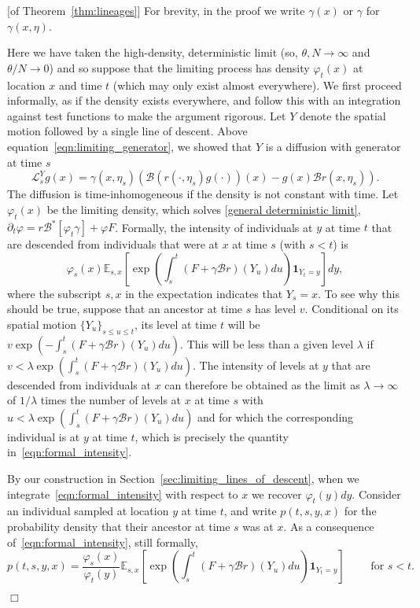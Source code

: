 \documentclass[12pt]{article}
\newenvironment {proof}{{\noindent\bf Proof }}{\hfill $\Box$ \medskip}
\newcommand{\IE}{\mathbb E}
\newcommand{\ind}{\mathbf{1}}
\newcommand{\DG}{\mathcal{B}}  %
\numberwithin{equation}{section}
\begin{document}
\begin{proof}[of Theorem~\ref{thm:lineages}]
For brevity, in the proof we write $\gamma(x)$ or $\gamma$ for $\gamma(x,\eta)$.

Here we have taken the high-density, deterministic limit
(so, $\theta, N \to \infty$ and $\theta/N \to 0$)
and so suppose that the limiting process has density $\varphi_t(x)$
at location $x$ and time $t$ (which may only exist almost everywhere).
We first proceed informally, as if the density exists everywhere,
and follow this with an integration against test functions to make the argument rigorous.
Let $Y$ denote the spatial motion followed by a single line of descent.
Above equation~\eqref{eqn:limiting_generator},
we showed that $Y$ is a diffusion with generator at time $s$
$$
    \mathcal{L}^Y_s g(x) = \gamma(x,\eta_s) ( \DG(r(\cdot,\eta_s) g(\cdot))(x) - g(x) \DG r(x,\eta_s) ) .
$$
The diffusion is time-inhomogeneous if the density is not constant with time.
Let $\varphi_t(x)$ be the limiting density, which solves \eqref{general deterministic limit},
$\partial_t \varphi = r \DG^*[ \varphi_t \gamma ] + \varphi F$.
Formally, the intensity of individuals at $y$ at time $t$
that are descended from individuals that were at $x$ at time $s$
(with $s < t$) is
\begin{equation} \label{eqn:formal_intensity}
    \varphi_s(x) \IE_{s,x} \left[
        \exp\left(
            \int_s^t (F + \gamma \DG r)(Y_u) du
        \right)
        \ind_{Y_t = y}
    \right]
    dy ,
\end{equation}
where the subscript $s, x$ in the expectation indicates that $Y_s = x$.
To see why this should be true, 
suppose that an ancestor at time $s$ has level $v$. Conditional on its 
spatial motion $\{Y_u\}_{s\leq u\leq t}$, its level at time $t$ will
be $v \exp(-\int_s^t(F+\gamma\DG r)(Y_u)du)$. This will be less than a given level 
$\lambda$ if $v < \lambda \exp(\int_s^t(F+\gamma\DG r)(Y_u)du)$. 
The intensity of levels at $y$ that are descended from individuals at
$x$ can therefore be obtained as the limit as $\lambda\to\infty$ of 
$1/\lambda$ times the number of levels at $x$ at time $s$ with
$u<\lambda \exp(\int_s^t(F+\gamma\DG r)(Y_u)du)$ and for which
the corresponding individual is at $y$ at time $t$, which is 
precisely the quantity in~\eqref{eqn:formal_intensity}. 

By our construction in Section~\ref{sec:limiting_lines_of_descent},
when we integrate~\eqref{eqn:formal_intensity}
with respect to $x$ we recover $\varphi_t(y)dy$. 
Consider an individual sampled at location $y$ at time $t$,
and write $p(t,s,y,x)$ for the probability density
that their ancestor at time $s$ was at $x$.
As a consequence of~\eqref{eqn:formal_intensity},
still formally,
\begin{equation}
\label{eqn:ptsyx}
    p(t,s,y,x)
    =
    \frac{\varphi_s(x)}{\varphi_t(y)}
    \IE_{s,x}\left[
        \exp\left( \int_s^t (F + \gamma\DG r)(Y_u) du \right)
        \ind_{Y_t=y}
    \right]
\qquad \text{ for } s < t.
\end{equation}


\end{proof}
\end{document}
